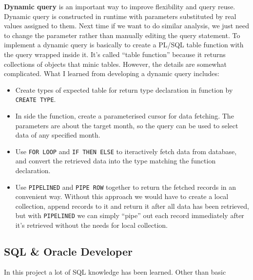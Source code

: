 \documentclass[
  a4paper,
]{article}
\providecommand{\tightlist}{%
  \setlength{\itemsep}{0pt}\setlength{\parskip}{0pt}}
\begin{document}
\textbf{Dynamic query} is an important way to improve flexibility and
query reuse. Dynamic query is constructed in runtime with parameters
substituted by real values assigned to them. Next time if we want to do
similar analysis, we just need to change the parameter rather than
manually editing the query statement. To implement a dynamic query is
basically to create a PL/SQL table function with the query wrapped
inside it. It's called ``table function'' because it returns collections
of objects that minic tables. However, the details are somewhat
complicated. What I learned from developing a dynamic query includes:

\begin{itemize}
\tightlist
\item
  Create types of expected table for return type declaration in function
  by \texttt{CREATE\ TYPE}.
\item
  In side the function, create a parameterised cursor for data fetching.
  The parameters are about the target month, so the query can be used to
  select data of any specified month.
\item
  Use \texttt{FOR\ LOOP} and \texttt{IF\ THEN\ ELSE} to iteractively
  fetch data from database, and convert the retrieved data into the type
  matching the function declaration.
\item
  Use \texttt{PIPELINED} and \texttt{PIPE\ ROW} together to return the
  fetched records in an convenient way. Without this approach we would
  have to create a local collection, append records to it and return it
  after all data has been retrieved, but with \texttt{PIPELINED} we can
  simply ``pipe'' out each record immediately after it's retrieved
  without the needs for local collection.
\end{itemize}

\hypertarget{sql-oracle-developer}{%
\subsection{SQL \& Oracle Developer}\label{sql-oracle-developer}}

In this project a lot of SQL knowledge has been learned. Other than
basic

\printbibliography
\end{document}
